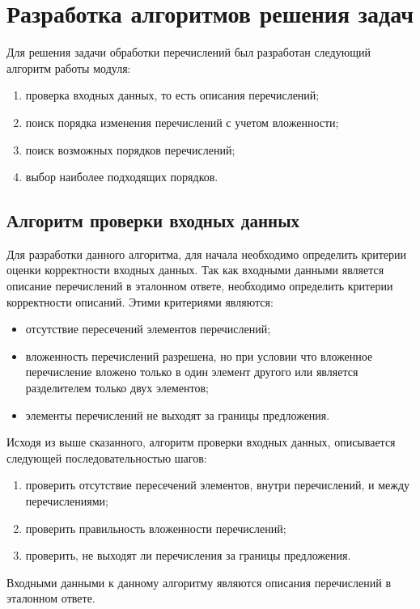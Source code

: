 \documentclass[a4paper,english,russian]{G2-105}
\begin{document}
\section{Разработка алгоритмов решения задач}

\par Для решения задачи обработки перечислений был разработан следующий алгоритм работы модуля:
\begin{enumerate}
    \item проверка входных данных, то есть описания перечислений;
    \item поиск порядка изменения перечислений с учетом вложенности;
    \item поиск возможных порядков перечислений;
    \item выбор наиболее подходящих порядков.
\end{enumerate}

\subsection{Алгоритм проверки входных данных}

\par Для разработки данного алгоритма, для начала необходимо определить критерии оценки корректности входных данных. Так как входными данными является описание перечислений в эталонном ответе, необходимо определить критерии корректности описаний. Этими критериями являются:
\begin{itemize}
    \item отсутствие пересечений элементов перечислений;
    \item вложенность перечислений разрешена, но при условии что вложенное перечисление вложено только в один элемент другого или является разделителем только двух элементов;
    \item элементы перечислений не выходят за границы предложения.
\end{itemize}
\par Исходя из выше сказанного, алгоритм проверки входных данных, описывается следующей последовательностью шагов:
\begin{enumerate}
    \item проверить отсутствие пересечений элементов, внутри перечислений, и между перечислениями;
    \item проверить правильность вложенности перечислений;
    \item проверить, не выходят ли перечисления за границы предложения.
\end{enumerate}
\par Входными данными к данному алгоритму являются описания перечислений в эталонном ответе.
\end{document}
